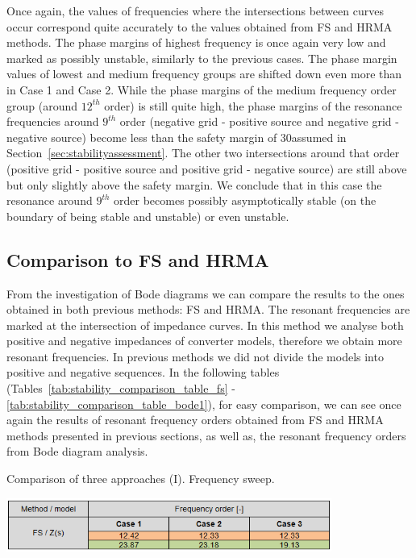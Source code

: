 \documentclass[a4paper,11pt,twoside]{report} %
\begin{document}
Once again, the values of frequencies where the intersections between curves occur correspond quite accurately to the values obtained from FS and HRMA methods. The phase margins of highest frequency is once again very low and marked as possibly unstable, similarly to the previous cases. The phase margin values of lowest and medium frequency groups are shifted down even more than in Case 1 and Case 2. While the phase margins of the medium frequency order group (around $12^{th}$ order) is still quite high, the phase margins of the resonance frequencies around $9^{th}$ order (negative grid - positive source and negative grid - negative source) become less than the safety margin of 30\degree assumed in Section~\ref{sec:stabilityassessment}. The other two intersections around that order (positive grid - positive source and positive grid - negative source) are still above but only slightly above the safety margin. We conclude that in this case the resonance around $9^{th}$ order becomes possibly asymptotically stable (on the boundary of being stable and unstable) or even unstable.

\subsection{Comparison to FS and HRMA}
From the investigation of Bode diagrams we can compare the results to the ones obtained in both previous methods: FS and HRMA. The resonant frequencies are marked at the intersection of impedance curves. In this method we analyse both positive and negative impedances of converter models, therefore we obtain more resonant frequencies. In previous methods we did not divide the models into positive and negative sequences. In the following tables (Tables~\ref{tab:stability_comparison_table_fs} - \ref{tab:stability_comparison_table_bode1}), for easy comparison, we can see once again the results of resonant frequency orders obtained from FS and HRMA methods presented in previous sections, as well as, the resonant frequency orders from Bode diagram analysis.

\begin{table}[htb]
	\centering
	\caption{Comparison of three approaches (I). Frequency sweep.}
	\includegraphics[width=0.8\textwidth]{img/Case123/stability_comparison_table_fs.png}
  	\label{tab:stability_comparison_table_fs}
\end{table}
\FloatBarrier
\end{document}
